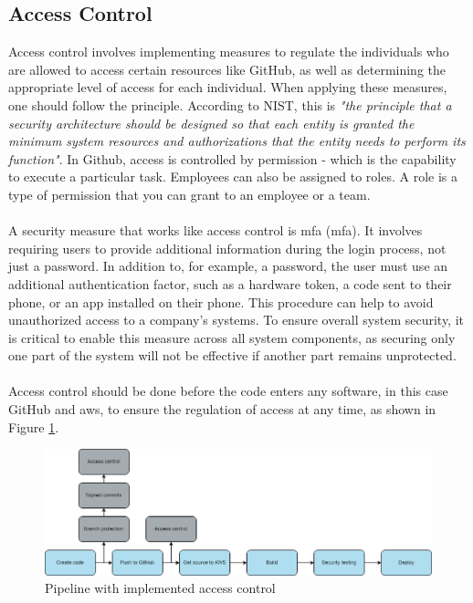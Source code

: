 \subsection{Access Control}
Access control involves implementing measures to regulate the individuals who are allowed to access certain resources like GitHub, as well as determining the appropriate level of access for each individual. When applying these measures, one should follow the  principle. According to NIST, this is \textit{"the principle that a security architecture should be designed so that each entity is granted the minimum system resources and authorizations that the entity needs to perform its function"}\cite{leastprivilege}. In Github, access is controlled by permission - which is the capability to execute a particular task. Employees can also be assigned to roles. A role is a type of permission that you can grant to an employee or a team. \cite{accesscontroll}
\\~\\
A security measure that works like access control is \acrlong{mfa} (\acrshort{mfa}). It involves requiring users to provide additional information during the login process, not just a password. In addition to, for example, a password, the user must use an additional authentication factor, such as a hardware token, a code sent to their phone, or an app installed on their phone. This procedure can help to avoid unauthorized access to a company's systems. To ensure overall system security, it is critical to enable this measure across all system components, as securing only one part of the system will not be effective if another part remains unprotected. \cite{MFA}
\\~\\
Access control should be done before the code enters any software, in this case GitHub and \acrshort{aws}, to ensure the regulation of access at any time, as shown in Figure \ref{fig: Pipeline with implemented access control}.

\vspace{2mm}
\begin{figure}[H]
    \centering
    \includegraphics[width=0.8\columnwidth]{Images/pipeline7.png}
    \caption{Pipeline with implemented access control}
    \label{fig: Pipeline with implemented access control}
\end{figure}
 
